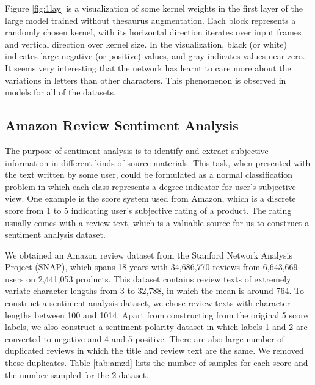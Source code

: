 \documentclass{article}
\begin{document}
\begin{CJK}{UTF8}{gbsn}
Figure \ref{fig:1lay} is a visualization of some kernel weights in the first layer of the large model trained without thesaurus augmentation. Each block represents a randomly chosen kernel, with its horizontal direction iterates over input frames and vertical direction over kernel size. In the visualization, black (or white) indicates large negative (or positive) values, and gray indicates values near zero. It seems very interesting that the network has learnt to care more about the variations in letters than other characters. This phenomenon is observed in models for all of the datasets.

\subsection{Amazon Review Sentiment Analysis}

The purpose of sentiment analysis is to identify and extract subjective information in different kinds of source materials. This task, when presented with the text written by some user, could be formulated as a normal classification problem in which each class represents a degree indicator for user's subjective view. One example is the score system used from Amazon, which is a discrete score from 1 to 5 indicating user's subjective rating of a product. The rating usually comes with a review text, which is a valuable source for us to construct a sentiment analysis dataset.

We obtained an Amazon review dataset from the Stanford Network Analysis Project (SNAP), which spans 18 years with 34,686,770 reviews from 6,643,669 users on 2,441,053 products\cite{ML13}. This dataset contains review texts of extremely variate character lengths from 3 to 32,788, in which the mean is around 764. To construct a sentiment analysis dataset, we chose review texts with character lengths between 100 and 1014. Apart from constructing from the original 5 score labels, we also construct a sentiment polarity dataset in which labels 1 and 2 are converted to negative and 4 and 5 positive. There are also large number of duplicated reviews in which the title and review text are the same. We removed these duplicates. Table \ref{tab:amzd} lists the number of samples for each score and the number sampled for the 2 dataset.


\end{CJK}
\end{document}
